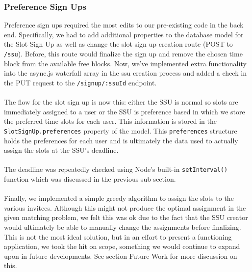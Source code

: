 \documentclass[11pt]{article}   %
\begin{document}
\subsubsection*{Preference Sign Ups}
Preference sign ups required the most edits to our pre-existing code in the back end. Specifically, we had to add additional properties to the database model for the Slot Sign Up as well as change the slot sign up creation route (POST to \texttt{/ssu}). Before, this route would finalize the sign up and remove the chosen time block from the available free blocks. Now, we've implemented extra functionality into the async.js waterfall array in the ssu creation process and added a check in the PUT request to the \texttt{/signup/:ssuId} endpoint.\\~\\
The flow for the slot sign up is now this: either the SSU is normal so slots are immediately assigned to a user or the SSU is preference based in which we store the preferred time slots for each user. This information is stored in the \texttt{SlotSignUp.preferences} property of the model. This \texttt{preferences} structure holds the preferences for each user and is ultimately the data used to actually assign the slots at the SSU's deadline.\\~\\
The deadline was repeatedly checked using Node's built-in \texttt{setInterval()} function which was discussed in the previous sub section. \\~\\
Finally, we implemented a simple greedy algorithm to assign the slots to the various invitees. Although this might not produce the optimal assignment in the given matching problem, we felt this was ok due to the fact that the SSU creator would ultimately be able to manually change the assignments before finalizing. This is not the most ideal solution, but in an effort to present a functioning application, we took the hit on scope, something we would continue to expand upon in future developments. See section Future Work for more discussion on this. 
\end{document}
